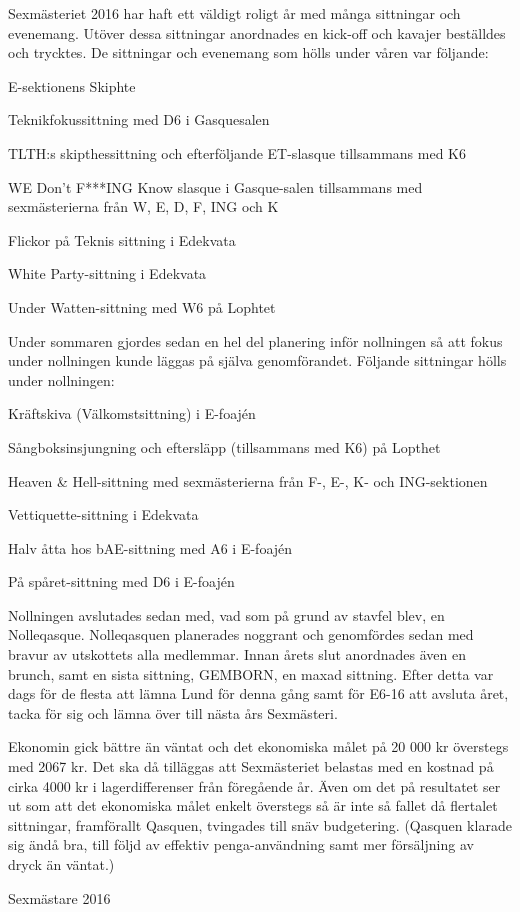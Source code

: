 \documentclass[../_main/handlingar.tex]{subfiles}
\begin{document}
Sexmästeriet 2016 har haft ett väldigt roligt år med många sittningar och evenemang. Utöver dessa sittningar anordnades en kick-off och kavajer beställdes och trycktes. De sittningar och evenemang som hölls under våren var följande:
\begin{dashlist}
  \item E-sektionens Skiphte
  \item Teknikfokussittning med D6 i Gasquesalen
  \item TLTH:s skipthessittning och efterföljande ET-slasque tillsammans med K6
  \item WE Don’t F***ING Know slasque i Gasque-salen tillsammans med sexmästerierna från W, E, D, F, ING och K
  \item Flickor på Teknis sittning i Edekvata
  \item White Party-sittning i Edekvata
  \item Under Watten-sittning med W6 på Lophtet
\end{dashlist}
Under sommaren gjordes sedan en hel del planering inför nollningen så att fokus under nollningen kunde läggas på själva genomförandet. Följande sittningar hölls under nollningen:
\begin{dashlist}
  \item Kräftskiva (Välkomstsittning) i E-foajén
  \item Sångboksinsjungning och eftersläpp (tillsammans med K6)  på Lopthet
  \item Heaven \& Hell-sittning med sexmästerierna från F-, E-, K- och ING-sektionen
  \item Vettiquette-sittning i Edekvata
  \item Halv åtta hos bAE-sittning med A6 i E-foajén
  \item På spåret-sittning med D6 i E-foajén
\end{dashlist}
Nollningen avslutades sedan med, vad som på grund av stavfel blev, en Nolleqasque. Nolleqasquen planerades noggrant och genomfördes sedan med bravur av utskottets alla medlemmar. Innan årets slut anordnades även en brunch, samt en sista sittning, GEMBORN, en maxad sittning. Efter detta var dags för de flesta att lämna Lund för denna gång samt för E6-16 att avsluta året, tacka för sig och lämna över till nästa års Sexmästeri.

Ekonomin gick bättre än väntat och det ekonomiska målet på 20 000 kr överstegs med 2067 kr. Det ska då tilläggas att Sexmästeriet belastas med en kostnad på cirka 4000 kr i lagerdifferenser från föregående år. Även om det på resultatet ser ut som att det ekonomiska målet enkelt överstegs så är inte så fallet då flertalet sittningar, framförallt Qasquen, tvingades till snäv budgetering. (Qasquen klarade sig ändå bra, till följd av effektiv penga-användning samt mer försäljning av dryck än väntat.)
\begin{signatures}{1}
    \mvh
    \signature{Martin Gemborn Nilsson}{Sexmästare 2016}
\end{signatures}
\end{document}
